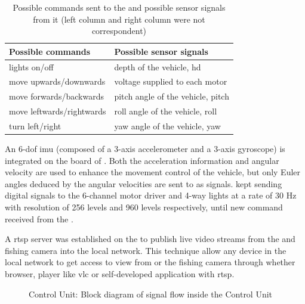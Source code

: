 \begin{table}[htb]
    \renewcommand*{\arraystretch}{1.3}
    \centering
    \begin{tabularx}{0.8\textwidth}{XX}
        \toprule
        \textbf{Possible commands} & \textbf{Possible sensor signals}        \\
        \midrule
        lights on/off              & depth of the vehicle, \gls{hd}          \\
        move upwards/downwards     & voltage supplied to each motor          \\
        move forwards/backwards    & pitch angle of the vehicle, \gls{pitch} \\
        move leftwards/rightwards  & roll angle of the vehicle, \gls{roll}   \\
        turn left/right            & yaw angle of the vehicle, \gls{yaw}     \\
        \bottomrule
    \end{tabularx}
    \caption[Possible Commands and Sensor Signals for STM32 board]{Possible
        commands sent to the  and possible sensor signals from it
        (left column and right column were not correspondent)}\label{t:stm32}
\end{table}

An 6-\gls{dof} \gls{imu} (composed of a 3-axis accelerometer and a 3-axis
gyroscope) is integrated on the board of . Both the
acceleration information and angular velocity are used to enhance the movement
control of the vehicle, but only Euler angles deduced by the angular velocities
are sent to  as signals.  kept sending
digital signals to the 6-channel motor driver and 4-way lights at a rate of 30
Hz with resolution of 256 levels and 960 levels respectively, until new command
received from the .

A \gls{rtsp} server was established on the  to publish live
video streams from the  and fishing camera into the local
network. This technique allow any device in the local network to get access to
view from  or the fishing camera through whether browser, player
like vlc or self-developed application with \gls{rtsp}.

\begin{figure}[htb]
    \caption[Control Unit]{Control Unit: Block diagram of signal flow inside the
        Control Unit}\label{f:cu}
\end{figure}

